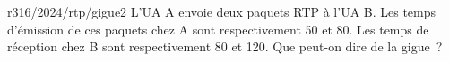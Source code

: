 \begin{question}{r316/2024/rtp/gigue2}
  L'UA A envoie deux paquets RTP à l'UA B. Les temps d'émission de
  ces paquets chez A sont respectivement 50 et 80. Les temps de
  réception chez B sont respectivement 80 et 120. Que peut-on dire
  de la gigue~?
  \begin{reponses}
  \end{reponses}
\end{question}
